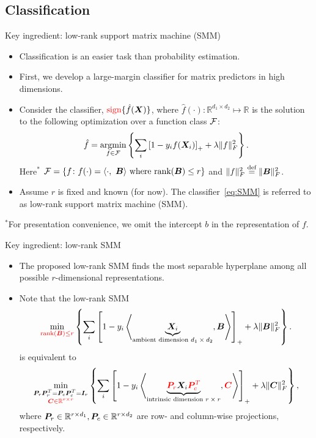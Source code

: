 \documentclass[compress,dvipsnames]{beamer}
\let\olditem\item
\renewcommand\item{\olditem\justifying}
\begin{document}
\subsection{Classification}
\begin{frame}{Key ingredient: low-rank support matrix machine (SMM)}
\begin{itemize}
\item Classification is an easier task than probability estimation. 
\item First, we develop a large-margin classifier for {\color{red} matrix predictors in high dimensions}.
\item Consider the classifier, ${\color{red}\text{sign}}\{\hat f(\bm{X})\}$, where $\hat f(\cdot)\colon \mathbb{R}^{d_1\times d_2}\mapsto \mathbb{R}$ is the solution to the following optimization over a function class ${\mathcal F}$:
\begin{equation}\label{eq:SMM}
\hat f = \operatorname*{argmin}_{f\in{\mathcal F}}\left\{\sum_i \left[1-y_i f(\bm{X}_i)\right]_{+}+\lambda\lVert f\rVert_F^2\right\}.
\end{equation}
Here$^{*}$ ${\mathcal F}=\{f\colon f(\cdot)=\langle\cdot,\ \bm{B} \rangle \text{ where $\text{rank}(\bm{B})\leq r$}\}$ and $\lVert f\rVert_F^2\stackrel{\text{def}}{=}\lVert\bm{B}\rVert_F^2$.
\item Assume $r$ is fixed and known (for now). The classifier~\eqref{eq:SMM} is referred to as {\color{red}low-rank support matrix machine (SMM)}. 
\end{itemize}

{\scriptsize $^*$For presentation convenience, we omit the intercept $b$ in the representation of $f$.}
\end{frame}

\begin{frame}{Key ingredient: low-rank SMM}
\begin{itemize}
\item The proposed low-rank SMM finds the {\color{red}most separable hyperplane} among {\color{red}all possible $r$-dimensional representations}. 
\item Note that the low-rank SMM
\[
\min_{{\color{red}\text{rank}(\mB)\leq r}} \left\{\sum_i\left[ 1- y_i\left\langle \KeepStyleUnderBrace{\mX_i}_{\text{ambient dimension $d_1\times d_2$}}, \mB\right\rangle\right]_{+}+\lambda\FnormSize{}{\mB}^2\right\}.
\]
is equivalent to
\[
\min_{\substack{\mP_r\mP^T_r=\mP_c\mP^T_c=\mI_r \\ {\color{red}\mC\in\mathbb{R}^{r\times r}}}} \left\{\sum_i\left[ 1- y_i\left\langle \KeepStyleUnderBrace{{\color{red}\mP_r}\mX_i{\color{red}\mP^T_c}}_{\text{intrinsic dimension $r\times r$}}, {\color{red}\mC}\right\rangle\right]_{+}+\lambda\FnormSize{}{\mC}^2\right\},
\]
where $\bm{P}_r\in\mathbb{R}^{r\times d_1}, \bm{P}_c\in\mathbb{R}^{r\times d_2}$ are row- and column-wise projections, respectively. 
\end{itemize}
\end{frame}
\end{document}
